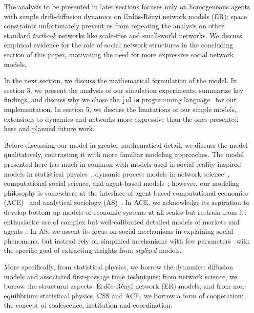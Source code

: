 The analysis to be presented in later sections focuses only on homogeneous agents with simple drift-diffusion dynamics on Erd\H{o}s-R\'{e}nyi network models (ER); space constraints unfortunately prevent us from repeating the analysis on other standard \textit{textbook} networks like scale-free and small-world networks. We discuss empirical evidence for the role of social network structures in the concluding section of this paper, motivating the need for more expressive social network models. 


In the next section, we discuss the mathematical formulation of the model. In section 3, we present the analysis of our simulation experiments, summarize key findings, and discuss why we chose the \texttt{julia} programming language~\cite{Julia-2017} for our implementation. In section 5, we discuss the limitations of our simple models, extensions to dynamics and networks more expressive than the ones presented here and planned future work. 

Before discussing our model in greater mathematical detail, we discuss the model qualitatively, contrasting it with more familiar modeling approaches. The model presented here has much in common with models used in social-reality-inspired models in statistical physics~\cite{redner2001guide}, dynamic process models in network science~\cite{newman2018networks}, computational social science, and agent-based models~\cite{abm_review}; however, our modeling philosophy is somewhere at the interface of agent-based computational economics (ACE)~\cite{tesfatsion} and analytical sociology (AS)~\cite{ch1as_hdbk,ch2as_hdbk}. In ACE, we acknowledge its aspiration to develop bottom-up models of economic systems at all scales but restrain from its enthusiastic use of complex but well-calibrated detailed models of markets and agents~\cite{tesfatsion2017}. In AS, we assent its focus on social mechanisms in explaining social phenomena, but instead rely on simplified mechanisms with few parameters~\cite{ch11as_hdbk} with the specific goal of extracting insights from \textit{stylized} models.       

More specifically, from statistical physics, we borrow the dynamics: diffusion models and associated first-passage time techniques; from network science, we borrow the structural aspects: Erd\H{o}s-R\'{e}nyi network (ER) models; and from non-equilibrium statistical physics, CSS and ACE, we borrow a form of cooperation: the concept of coalescence, institution and coordination. 


